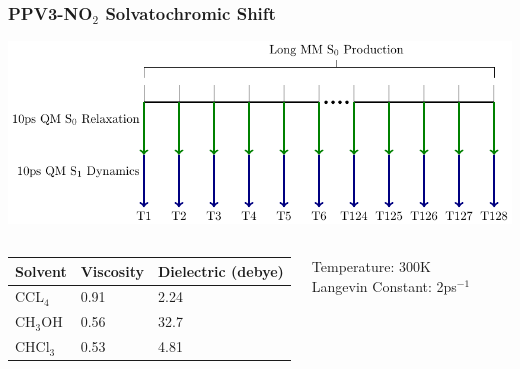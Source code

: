 \documentclass{beamer}
\begin{document}
\begin{frame}
  \frametitle{PPV3-NO$_2$ Solvatochromic Shift }
  \includegraphics[width=\textwidth]{scripted_diagrams/spectra_simulation.pdf}
\begin{columns}[c]
\begin{block}{}
    \begin{table}[]
    \begin{tabular}{lll}
    Solvent & Viscosity &  Dielectric (debye) \\
      \hline
      CCL$_4$ & 0.91 & 2.24  \\
      CH$_3$OH & 0.56 &  32.7 \\
      CHCl$_3$ & 0.53 & 4.81 
    \end{tabular}
    \end{table}

\end{block}

\begin{block}{}
  Temperature: 300K\\
  Langevin Constant: 2ps$^{-1}$
\end{block}
\end{columns}
\end{frame}
\end{document}
